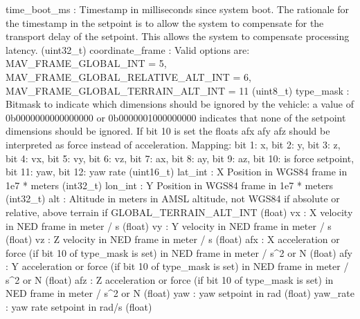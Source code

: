 \begin{DoxyVerb}
\begin{DoxyVerb}
\begin{DoxyVerb}
\begin{DoxyVerb}
\begin{DoxyVerb}
time_boot_ms              : Timestamp in milliseconds since system boot. The rationale for the timestamp in the setpoint is to allow the system to compensate for the transport delay of the setpoint. This allows the system to compensate processing latency. (uint32_t)
coordinate_frame          : Valid options are: MAV_FRAME_GLOBAL_INT = 5, MAV_FRAME_GLOBAL_RELATIVE_ALT_INT = 6, MAV_FRAME_GLOBAL_TERRAIN_ALT_INT = 11 (uint8_t)
type_mask                 : Bitmask to indicate which dimensions should be ignored by the vehicle: a value of 0b0000000000000000 or 0b0000001000000000 indicates that none of the setpoint dimensions should be ignored. If bit 10 is set the floats afx afy afz should be interpreted as force instead of acceleration. Mapping: bit 1: x, bit 2: y, bit 3: z, bit 4: vx, bit 5: vy, bit 6: vz, bit 7: ax, bit 8: ay, bit 9: az, bit 10: is force setpoint, bit 11: yaw, bit 12: yaw rate (uint16_t)
lat_int                   : X Position in WGS84 frame in 1e7 * meters (int32_t)
lon_int                   : Y Position in WGS84 frame in 1e7 * meters (int32_t)
alt                       : Altitude in meters in AMSL altitude, not WGS84 if absolute or relative, above terrain if GLOBAL_TERRAIN_ALT_INT (float)
vx                        : X velocity in NED frame in meter / s (float)
vy                        : Y velocity in NED frame in meter / s (float)
vz                        : Z velocity in NED frame in meter / s (float)
afx                       : X acceleration or force (if bit 10 of type_mask is set) in NED frame in meter / s^2 or N (float)
afy                       : Y acceleration or force (if bit 10 of type_mask is set) in NED frame in meter / s^2 or N (float)
afz                       : Z acceleration or force (if bit 10 of type_mask is set) in NED frame in meter / s^2 or N (float)
yaw                       : yaw setpoint in rad (float)
yaw_rate                  : yaw rate setpoint in rad/s (float)\end{DoxyVerb}
 \mbox{\label{classpymavlink_1_1dialects_1_1v10_1_1MAVLink_a057b9208437b52840ff274810955698a}} 

\end{DoxyVerb}
\end{DoxyVerb}
\end{DoxyVerb}
\end{DoxyVerb}
